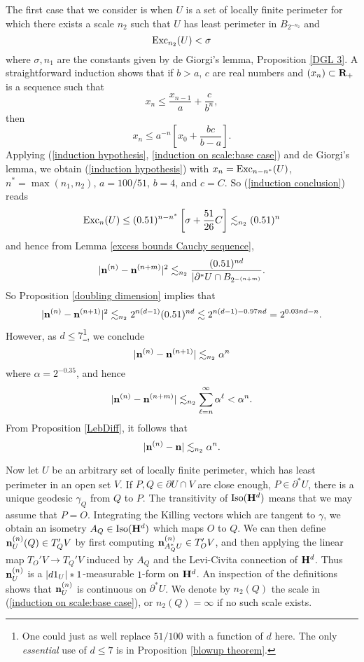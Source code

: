 The first case that we consider is when $U$ is a set of locally finite perimeter for which there exists a scale $n_2$ such that $U$ has least perimeter in $B_{2^{-n_2}}$ and
\begin{equation}\label{induction on scale:base case}
    \operatorname{Exc}_{n_2}(U) < \sigma
\end{equation}
where $\sigma, n_1$ are the constants given by de Giorgi's lemma, Proposition \ref{DGL 3}.
A straightforward induction shows that if $b > a$, $c$ are real numbers and $(x_n) \subset \mathbf{R}_+$ is a sequence such that
\begin{equation}\label{induction hypothesis}
x_n \leq \frac{x_{n - 1}}{a} + \frac{c}{b^n},
\end{equation}
then
\begin{equation}\label{induction conclusion}
x_n \leq a^{-n}\left[x_0 + \frac{bc}{b - a}\right].
\end{equation}
Applying (\ref{induction hypothesis}, \ref{induction on scale:base case}) and de Giorgi's lemma, we obtain (\ref{induction hypothesis}) with $x_n = \operatorname{Exc}_{n - n^*}(U)$, $n^* = \max(n_1, n_2)$, $a = 100/51$, $b = 4$, and $c = C$.
So (\ref{induction conclusion}) reads
$$\operatorname{Exc}_n(U) \leq (0.51)^{n - n^*} \left[\sigma + \frac{51}{26}C\right] \lesssim_{n_2} (0.51)^n$$
and hence from Lemma \ref{excess bounds Cauchy sequence},
$$|\mathbf n^{(n)} - \mathbf n^{(n + m)}|^2 \lesssim_{n_2} \frac{(0.51)^{nd}}{|\partial^* U \cap B_{2^{-(n + m)}}}.$$
So Proposition \ref{doubling dimension} implies that
$$|\mathbf n^{(n)} - \mathbf n^{(n + 1)}|^2 \lesssim_{n_2} 2^{n(d - 1)} (0.51)^{nd} \lesssim 2^{n(d - 1) - 0.97 nd} = 2^{0.03nd - n}.$$
However, as $d \leq 7$\footnote{One could just as well replace $51/100$ with a function of $d$ here. The only \emph{essential} use of $d \leq 7$ is in Proposition \ref{blowup theorem}.}, we conclude
$$|\mathbf n^{(n)} - \mathbf n^{(n + 1)}| \lesssim_{n_2} \alpha^n$$
where $\alpha = 2^{-0.35}$, and hence
$$|\mathbf n^{(n)} - \mathbf n^{(n + m)}| \lesssim_{n_2} \sum_{\ell=n}^\infty \alpha^\ell < \alpha^n.$$
From Proposition \ref{LebDiff}, it follows that
\begin{equation}\label{normal convergence rate}
    |\mathbf n^{(n)} - \mathbf n| \lesssim_{n_2} \alpha^n.
\end{equation}

Now let $U$ be an arbitrary set of locally finite perimeter, which has least perimeter in an open set $V$.
If $P, Q \in \partial U \cap V$ are close enough, $P \in \partial^* U$, there is a unique geodesic $\gamma_Q$ from $Q$ to $P$.
The transitivity of $\operatorname{Iso}(\mathbf H^d)$ means that we may assume that $P = O$.
Integrating the Killing vectors which are tangent to $\gamma$, we obtain an isometry $A_Q \in \operatorname{Iso}(\mathbf H^d)$ which maps $O$ to $Q$.
We can then define $\mathbf n^{(n)}_U(Q) \in T_Q' V$ by first computing $\mathbf n^{(n)}_{A_Q^* U} \in T_O' V$, and then applying the linear map $T_O' V \to T_Q' V$ induced by $A_Q$ and the Levi-Civita connection of $\mathbf H^d$.
Thus $\mathbf n^{(n)}_U$ is a $|d1_U|*1$-measurable $1$-form on $\mathbf H^d$.
An inspection of the definitions shows that $\mathbf n^{(n)}_U$ is continuous on $\partial^* U$.
We denote by $n_2(Q)$ the scale in (\ref{induction on scale:base case}), or $n_2(Q) = \infty$ if no such scale exists.

